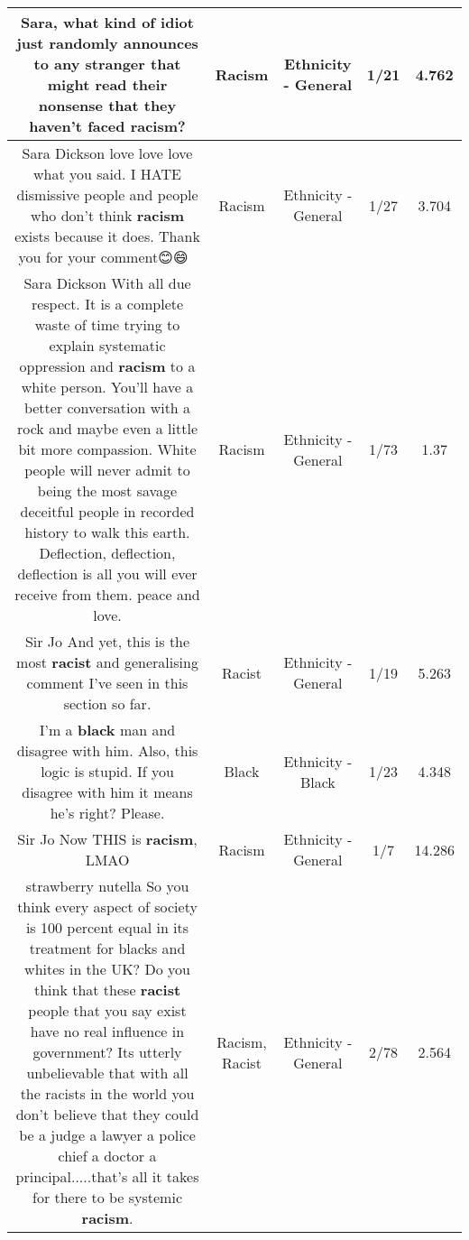 \documentclass[11pt]{article}
\newlength\mylength
\begin{document}
\begin{center}
\begin{longtable}{|C{.65\mylength}|C{.30\mylength}|C{.12\mylength}|C{.12\mylength}|C{.12\mylength}|}
  \small Sara, what kind of idiot just randomly announces to any stranger that might read their nonsense that they haven't faced \textbf{racism}?\normalsize   & Racism & Ethnicity - General & 1/21 & 4.762 \\  \hline
  \small Sara Dickson love love love what you said. I HATE dismissive people and people who don't think \textbf{racism} exists because it does. Thank you for your comment😊😄✊🏿\normalsize   & Racism & Ethnicity - General & 1/27 & 3.704 \\  \hline
  \small Sara Dickson  With all due respect.    It is a complete waste of time trying to explain systematic oppression and \textbf{racism} to a white person. You'll have a better conversation with a rock and maybe even a little bit more compassion. White people will never admit to being the most savage deceitful people in recorded history to walk this earth.  Deflection, deflection, deflection is all you will ever receive from them. peace and love.\normalsize   & Racism & Ethnicity - General & 1/73 & 1.37 \\  \hline
  \small Sir Jo And yet, this is the most \textbf{racist} and generalising comment I've seen in this section so far.\normalsize   & Racist & Ethnicity - General & 1/19 & 5.263 \\  \hline
  \small I'm a \textbf{black} man and disagree with him. Also, this logic is stupid. If you disagree with him it means he's right? Please.\normalsize   & Black & Ethnicity - Black & 1/23 & 4.348 \\  \hline
  \small Sir Jo Now THIS is \textbf{racism}, LMAO\normalsize   & Racism & Ethnicity - General & 1/7 & 14.286 \\  \hline
  \small strawberry nutella So you think every aspect of society is 100 percent equal in its treatment for blacks and whites in the UK?  Do you think that these \textbf{racist} people that you say exist have no real influence in government?  Its utterly unbelievable that with all the racists in the world you don't believe that they could be a judge a lawyer a police chief a doctor a principal.....that's all it takes for there to be systemic \textbf{racism}.\normalsize   & Racism, Racist & Ethnicity - General & 2/78 & 2.564 \\  \hline

\end{longtable}
\end{center}
\end{document}
